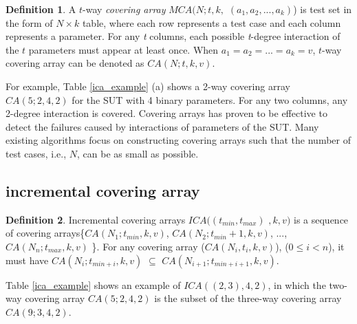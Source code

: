 \documentclass[conference]{IEEEtran}
\theoremstyle{definition}
\newtheorem{definition}{Definition}
\begin{document}
\begin{definition}A $t$-way \emph{covering array} $MCA(N; t, k,$ $(a_{1}, a_{2}, ..., a_{k})$) is test set in the form of $N \times k$ table, where each row represents a test case and each column represents a parameter.  For any \emph{t} columns, each possible \emph{t}-degree interaction of the $t$ parameters must appear at least once. When $ a_{1} = a_{2} = ... = a_{k} = v $, $t$-way covering array can be denoted as $CA(N; t, k, v)$.
\end{definition}


For example, Table \ref{ica_example} (a) shows a 2-way covering array $CA(5;2,4,2)$ for the SUT with 4 binary parameters. For any two columns, any 2-degree interaction is covered.  Covering arrays has proven to be effective to detect the failures caused by interactions of parameters of the SUT. Many existing algorithms focus on constructing covering arrays such that the number of test cases, i.e., $N$, can be as small as possible.


\subsection{incremental covering array}

\begin{definition}
Incremental covering arrays $ICA((t_{min},t_{max})$ $, k, v)$ is a sequence of covering arrays\{$CA(N_{1}; t_{min}, k, v)$, $CA(N_{2}; t_{min} + 1, k, v)$, ..., $CA(N_{n}; t_{max}, k, v)$ \}. For any covering array ($CA(N_{i}, t_{i}, k , v)$), ($ 0 \leq i < n$), it must have $CA(N_{i}; t_{min + i}, k, v)$ $\subseteq$ $CA(N_{i+1}; t_{min + i + 1}, k, v)$.
\end{definition}


Table \ref{ica_example} shows an example of $ICA((2,3), 4, 2)$, in which the two-way covering array $CA(5;2,4,2)$ is the subset of the three-way covering array $CA(9;3,4,2)$.
\end{document}
